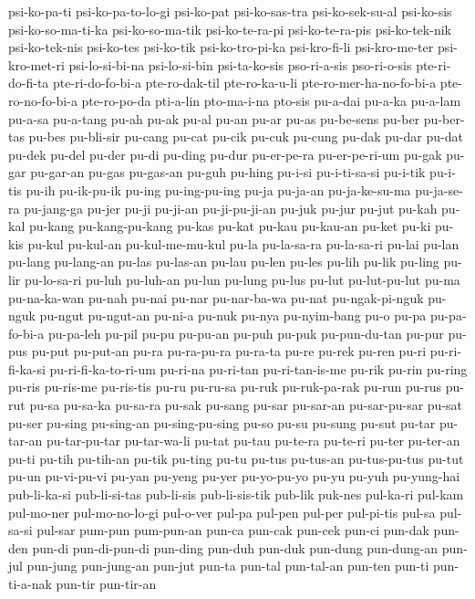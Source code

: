{psi-ko-pa-ti psi-ko-pa-to-lo-gi psi-ko-pat psi-ko-sas-tra psi-ko-sek-su-al
psi-ko-sis psi-ko-so-ma-ti-ka psi-ko-so-ma-tik psi-ko-te-ra-pi
psi-ko-te-ra-pis psi-ko-tek-nik psi-ko-tek-nis psi-ko-tes psi-ko-tik
psi-ko-tro-pi-ka psi-kro-fi-li psi-kro-me-ter psi-kro-met-ri
psi-lo-si-bi-na psi-lo-si-bin psi-ta-ko-sis pso-ri-a-sis pso-ri-o-sis
pte-ri-do-fi-ta pte-ri-do-fo-bi-a pte-ro-dak-til pte-ro-ka-u-li
pte-ro-mer-ha-no-fo-bi-a pte-ro-no-fo-bi-a pte-ro-po-da pti-a-lin
pto-ma-i-na pto-sis pu-a-dai pu-a-ka pu-a-lam pu-a-sa pu-a-tang pu-ah
pu-ak pu-al pu-an pu-ar pu-as pu-be-sens pu-ber pu-ber-tas pu-bes
pu-bli-sir pu-cang pu-cat pu-cik pu-cuk pu-cung pu-dak pu-dar pu-dat
pu-dek pu-del pu-der pu-di pu-ding pu-dur pu-er-pe-ra pu-er-pe-ri-um
pu-gak pu-gar pu-gar-an pu-gas pu-gas-an pu-guh pu-hing pu-i-si
pu-i-ti-sa-si pu-i-tik pu-i-tis pu-ih pu-ik-pu-ik pu-ing pu-ing-pu-ing
pu-ja pu-ja-an pu-ja-ke-su-ma pu-ja-se-ra pu-jang-ga pu-jer pu-ji pu-ji-an
pu-ji-pu-ji-an pu-juk pu-jur pu-jut pu-kah pu-kal pu-kang pu-kang-pu-kang
pu-kas pu-kat pu-kau pu-kau-an pu-ket pu-ki pu-kis pu-kul pu-kul-an
pu-kul-me-mu-kul pu-la pu-la-sa-ra pu-la-sa-ri pu-lai pu-lan pu-lang
pu-lang-an pu-las pu-las-an pu-lau pu-len pu-les pu-lih pu-lik pu-ling
pu-lir pu-lo-sa-ri pu-luh pu-luh-an pu-lun pu-lung pu-lus pu-lut
pu-lut-pu-lut pu-ma pu-na-ka-wan pu-nah pu-nai pu-nar pu-nar-ba-wa pu-nat
pu-ngak-pi-nguk pu-nguk pu-ngut pu-ngut-an pu-ni-a pu-nuk pu-nya
pu-nyim-bang pu-o pu-pa pu-pa-fo-bi-a pu-pa-leh pu-pil pu-pu pu-pu-an
pu-puh pu-puk pu-pun-du-tan pu-pur pu-pus pu-put pu-put-an pu-ra
pu-ra-pu-ra pu-ra-ta pu-re pu-rek pu-ren pu-ri pu-ri-fi-ka-si
pu-ri-fi-ka-to-ri-um pu-ri-na pu-ri-tan pu-ri-tan-is-me pu-rik pu-rin
pu-ring pu-ris pu-ris-me pu-ris-tis pu-ru pu-ru-sa pu-ruk pu-ruk-pa-rak
pu-run pu-rus pu-rut pu-sa pu-sa-ka pu-sa-ra pu-sak pu-sang pu-sar
pu-sar-an pu-sar-pu-sar pu-sat pu-ser pu-sing pu-sing-an pu-sing-pu-sing
pu-so pu-su pu-sung pu-sut pu-tar pu-tar-an pu-tar-pu-tar pu-tar-wa-li
pu-tat pu-tau pu-te-ra pu-te-ri pu-ter pu-ter-an pu-ti pu-tih pu-tih-an
pu-tik pu-ting pu-tu pu-tus pu-tus-an pu-tus-pu-tus pu-tut pu-un
pu-vi-pu-vi pu-yan pu-yeng pu-yer pu-yo-pu-yo pu-yu pu-yuh pu-yung-hai
pub-li-ka-si pub-li-si-tas pub-li-sis pub-li-sis-tik pub-lik puk-nes
pul-ka-ri pul-kam pul-mo-ner pul-mo-no-lo-gi pul-o-ver pul-pa pul-pen
pul-per pul-pi-tis pul-sa pul-sa-si pul-sar pum-pun pum-pun-an pun-ca
pun-cak pun-cek pun-ci pun-dak pun-den pun-di pun-di-pun-di pun-ding
pun-duh pun-duk pun-dung pun-dung-an pun-jul pun-jung pun-jung-an pun-jut
pun-ta pun-tal pun-tal-an pun-ten pun-ti pun-ti-a-nak pun-tir pun-tir-an
}
